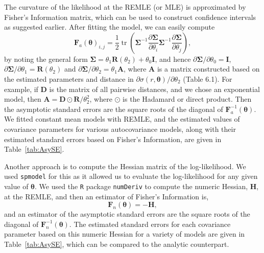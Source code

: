 \documentclass[12pt, titlepage]{article}
\begin{document}
The curvature of the likelihood at the REMLE (or MLE) is approximated by Fisher's Information matrix, which can be used to construct confidence intervals as suggested earlier.  After fitting the model, we can easily compute 
$$
\boldsymbol{F}_{a}{(\boldsymbol{\theta})_{i,j}} = \frac{1}{2}\operatorname{tr}\left(\boldsymbol{\Sigma}^{-1} \frac{\partial \boldsymbol{\Sigma}}{\partial\theta_i}{\boldsymbol{\Sigma}^{-1}}\frac{\partial\boldsymbol{\Sigma}}{\partial\theta_j}\right),
$$
by noting the general form $\boldsymbol{\Sigma} = \theta_{1}\mathbf{R}(\theta_{2}) + \theta_{0}\mathbf{I}$, and hence $\partial \boldsymbol{\Sigma}/ \partial \theta_0 = \mathbf{I}$, $\partial \boldsymbol{\Sigma}/ \partial \theta_1 = \mathbf{R}(\theta_{2})$ and $\partial \boldsymbol{\Sigma}/ \partial \theta_2 = \theta_{1}\mathbf{A}$, where $\mathbf{A}$ is a matrix constructed based on the estimated parameters and distance in $\partial \sigma(r,\boldsymbol{\theta})/\partial \theta_{2}$ (Table 6.1).  For example, if $\mathbf{D}$ is the matrix of all pairwise distances, and we chose an exponential model, then $\mathbf{A} = \mathbf{D}\odot\mathbf{R}/\theta_{2}^{2}$, where $\odot$ is the Hadamard or direct product.  Then the asymptotic standard errors are the square roots of the diagonal of $\boldsymbol{F}^{-1}_{a}{(\boldsymbol{\theta})}$.  We fitted constant mean models with REMLE, and the estimated values of covariance parameters for various autocovariance models, along with their estimated standard errors based on Fisher's Information, are given in Table~\ref{tab:AsySE}.

Another approach is to compute the Hessian matrix of the log-likelihood.  We used \texttt{spmodel} for this as it allowed us to evaluate the log-likelihood for any given value of $\boldsymbol{\theta}$.  We used the \texttt{R} package \texttt{numDeriv} to compute the numeric Hessian, $\mathbf{H}$, at the REMLE, and then an estimator of Fisher's Information is,
$$
\boldsymbol{F}_{n}{(\boldsymbol{\theta})} = -\mathbf{H},
$$
and an estimator of the asymptotic standard errors are the square roots of the diagonal of $\boldsymbol{F}^{-1}_{n}{(\boldsymbol{\theta})}$.  The estimated standard errors for each covariance parameter based on this numeric Hessian for a variety of models are given in Table~\ref{tab:AsySE}, which can be compared to the analytic counterpart.
\end{document}
